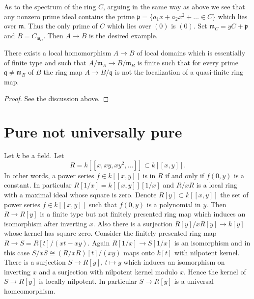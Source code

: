 \medskip\noindent
As to the spectrum of the ring $C$, arguing in the same way as above
we see that any nonzero prime ideal contains the prime
$\mathfrak p = \{a_1 x + a_2 x^2 + \ldots \in C\}$ which lies
over $\mathfrak m$. Thus the only prime of $C$ which lies over
$(0)$ is $(0)$. Set $\mathfrak m_C = yC + \mathfrak p$ and
$B = C_{\mathfrak m_C}$. Then $A \to B$ is the desired example.

\begin{lemma}
\label{lemma-topology-finite-type}
There exists a local homomorphism $A \to B$ of local domains which is
essentially of finite type and such that $A/\mathfrak m_A \to B/\mathfrak m_B$
is finite such that for every prime
$\mathfrak q \not = \mathfrak m_B$ of $B$ the ring map
$A \to B/\mathfrak q$ is not the localization of a quasi-finite ring map.
\end{lemma}

\begin{proof}
See the discussion above.
\end{proof}



\section{Pure not universally pure}
\label{section-pure-not-universally}

\noindent
Let $k$ be a field. Let
$$
R = k[[x, xy, xy^2, \ldots]] \subset k[[x, y]].
$$
In other words, a power series $f \in k[[x, y]]$ is in $R$ if and only
if $f(0, y)$ is a constant. In particular $R[1/x] = k[[x, y]][1/x]$
and $R/xR$ is a local ring with a maximal ideal whose square
is zero. Denote $R[y] \subset k[[x, y]]$ the set of power series
$f \in k[[x, y]]$ such that $f(0, y)$ is a polynomial in $y$. Then
$R \to R[y]$ is a finite type but not finitely presented ring map
which induces an isomorphism after inverting $x$. Also there is a
surjection $R[y]/xR[y] \to k[y]$ whose kernel has square zero. Consider
the finitely presented ring map $R \to S = R[t]/(xt - xy)$.
Again $R[1/x] \to S[1/x]$ is an isomorphism and in this case
$S/xS \cong (R/xR)[t]/(xy)$ maps onto $k[t]$ with nilpotent kernel.
There is a surjection $S \to R[y]$, $t \longmapsto y$ which induces
an isomorphism on inverting $x$ and a surjection with nilpotent kernel
modulo $x$. Hence the kernel of $S \to R[y]$ is locally nilpotent.
In particular $S \to R[y]$ is a universal homeomorphism.

